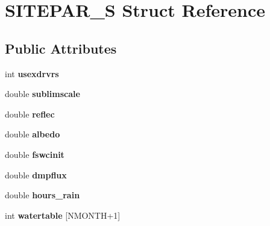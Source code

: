 \hypertarget{struct_s_i_t_e_p_a_r___s}{\section{S\-I\-T\-E\-P\-A\-R\-\_\-\-S Struct Reference}
\label{struct_s_i_t_e_p_a_r___s}
}
\subsection*{Public Attributes}
\begin{DoxyCompactItemize}
\item 
\hypertarget{struct_s_i_t_e_p_a_r___s_a505eb0781f82544a32afac841b7f83b0}{int {\bfseries usexdrvrs}}\label{struct_s_i_t_e_p_a_r___s_a505eb0781f82544a32afac841b7f83b0}

\item 
\hypertarget{struct_s_i_t_e_p_a_r___s_a6e5eddbc5dc48d4318e48e7e24886bdb}{double {\bfseries sublimscale}}\label{struct_s_i_t_e_p_a_r___s_a6e5eddbc5dc48d4318e48e7e24886bdb}

\item 
\hypertarget{struct_s_i_t_e_p_a_r___s_a04ab286c7ec8d3d98546b85a9611724a}{double {\bfseries reflec}}\label{struct_s_i_t_e_p_a_r___s_a04ab286c7ec8d3d98546b85a9611724a}

\item 
\hypertarget{struct_s_i_t_e_p_a_r___s_a752e8f076a749e108105b6079938b041}{double {\bfseries albedo}}\label{struct_s_i_t_e_p_a_r___s_a752e8f076a749e108105b6079938b041}

\item 
\hypertarget{struct_s_i_t_e_p_a_r___s_a84940e2c8cfeb6678c177dae3b3b3074}{double {\bfseries fswcinit}}\label{struct_s_i_t_e_p_a_r___s_a84940e2c8cfeb6678c177dae3b3b3074}

\item 
\hypertarget{struct_s_i_t_e_p_a_r___s_ad2e3273e37072d452c62cad52e4f2401}{double {\bfseries dmpflux}}\label{struct_s_i_t_e_p_a_r___s_ad2e3273e37072d452c62cad52e4f2401}

\item 
\hypertarget{struct_s_i_t_e_p_a_r___s_a857d3ebed53b660f057304e088fdef96}{double {\bfseries hours\-\_\-rain}}\label{struct_s_i_t_e_p_a_r___s_a857d3ebed53b660f057304e088fdef96}

\item 
\hypertarget{struct_s_i_t_e_p_a_r___s_ad539bc92a3e9d1d87768ce35e97ff016}{int {\bfseries watertable} \mbox{[}N\-M\-O\-N\-T\-H+1\mbox{]}}\label{struct_s_i_t_e_p_a_r___s_ad539bc92a3e9d1d87768ce35e97ff016}


\end{DoxyCompactItemize}
